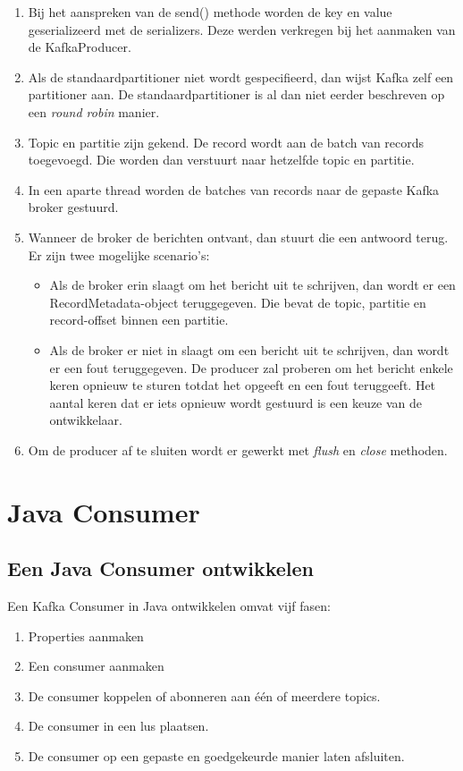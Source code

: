 \documentclass[a4paper,10pt,twoside]{report}
\begin{document}
\begin{enumerate}
	\item Bij het aanspreken van de send() methode worden de key en value geserializeerd met de serializers. Deze werden verkregen bij het aanmaken van de KafkaProducer.
	\item  Als de standaardpartitioner niet wordt gespecifieerd, dan wijst Kafka zelf een partitioner aan. De standaardpartitioner is al dan niet eerder beschreven op een \textit{round robin} manier.
	\item Topic en partitie zijn gekend. De record wordt aan de batch van records toegevoegd. Die worden dan verstuurt naar hetzelfde topic en partitie.
	\item In een aparte thread worden de batches van records naar de gepaste Kafka broker gestuurd.
	\item Wanneer de broker de berichten ontvant, dan stuurt die een antwoord terug. Er zijn twee mogelijke scenario's:
	\begin{itemize}
		\item Als de broker erin slaagt om het bericht uit te schrijven, dan wordt er een RecordMetadata-object teruggegeven. Die bevat de topic, partitie en record-offset binnen een partitie.
		\item Als de broker er niet in slaagt om een bericht uit te schrijven, dan wordt er een fout teruggegeven. De producer zal proberen om het bericht enkele keren opnieuw te sturen totdat het opgeeft en een fout teruggeeft. Het aantal keren dat er iets opnieuw wordt gestuurd is een keuze van de ontwikkelaar.
	\end{itemize}
	\item Om de producer af te sluiten wordt er gewerkt met \textit{flush} en \textit{close} methoden.
\end{enumerate}

\section{Java Consumer}

\subsection{Een Java Consumer ontwikkelen}

Een Kafka Consumer in Java ontwikkelen omvat vijf fasen:

\begin{enumerate}
	\item Properties aanmaken
	\item Een consumer aanmaken
	\item De consumer koppelen of abonneren aan één of meerdere topics.
	\item De consumer in een lus plaatsen.
	\item De consumer op een gepaste en goedgekeurde manier laten afsluiten.
\end{enumerate}
\end{document}

